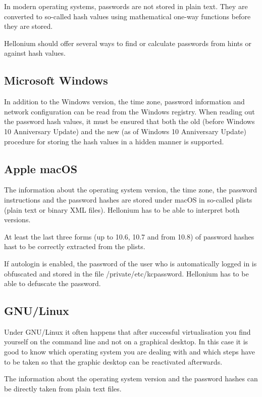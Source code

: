 In modern operating systems, passwords are not stored in plain text. They are converted to so-called hash values using mathematical one-way functions before they are stored.

Hellonium should offer several ways to find or calculate passwords from hints or against hash values.

\subsection{Microsoft Windows}

In addition to the Windows version, the time zone, password information and network configuration can be read from the Windows registry.
When reading out the password hash values, it must be ensured that both the old (before Windows 10 Anniversary Update) and the new (as of Windows 10 Anniversary Update) procedure for storing the hash values in a hidden manner is supported.

\subsection{Apple macOS}

The information about the operating system version, the time zone, the password instructions and the password hashes are stored under macOS in so-called plists (plain text or binary XML files). Hellonium has to be able to interpret both versions.

At least the last three forms (up to 10.6, 10.7 and from 10.8) of password hashes hast to be correctly extracted from the plists.

If autologin is enabled, the password of the user who is automatically logged in is obfuscated and stored in the file /private/etc/kcpassword. Hellonium has to be able to defuscate the password.

\subsection{GNU/Linux}

Under GNU/Linux it often happens that after successful virtualisation you find yourself on the command line and not on a graphical desktop.
In this case it is good to know which operating system you are dealing with and which steps have to be taken so that the graphic desktop can be reactivated afterwards.

The information about the operating system version and the password hashes can be directly taken from plain text files.

